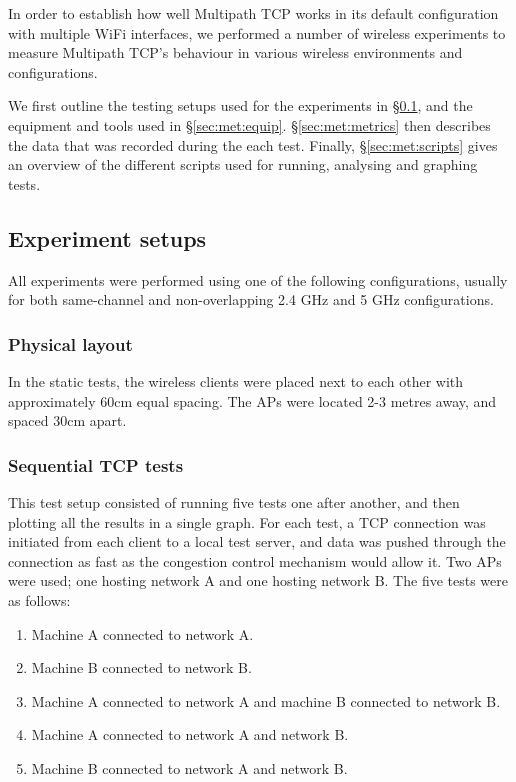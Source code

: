 In order to establish how well Multipath TCP works in its default configuration
with multiple WiFi interfaces, we performed a number of wireless experiments to
measure Multipath TCP's behaviour in various wireless environments and
configurations.

We first outline the testing setups used for the experiments in
\S\ref{sec:met:setups}, and the equipment and tools used in
\S\ref{sec:met:equip}. \S\ref{sec:met:metrics} then describes the data that was
recorded during the each test. Finally, \S\ref{sec:met:scripts} gives an
overview of the different scripts used for running, analysing and graphing
tests.

\subsection{Experiment setups}
\label{sec:met:setups}
All experiments were performed using one of the following configurations,
usually for both same-channel and non-overlapping 2.4 GHz and 5 GHz
configurations.

\subsubsection{Physical layout}
In the static tests, the wireless clients were placed next to each other with
approximately 60cm equal spacing. The APs were located 2-3 metres away, and
spaced 30cm apart.

\subsubsection{Sequential TCP tests}
\label{sec:met:setups:seqtcp}
This test setup consisted of running five tests one after another, and then
plotting all the results in a single graph. For each test, a TCP connection was
initiated from each client to a local test server, and data was pushed through
the connection as fast as the congestion control mechanism would allow it. Two
APs were used; one hosting network A and one hosting network B. The five tests
were as follows:

\begin{enumerate}
  \item Machine A connected to network A.
  \item Machine B connected to network B.
  \item Machine A connected to network A and machine B connected to network B.
  \item Machine A connected to network A and network B.
  \item Machine B connected to network A and network B.
\end{enumerate}


